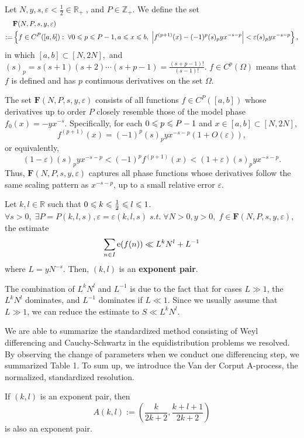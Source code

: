 \begin{definition}
    Let $N, y, s, \varepsilon < \frac{1}{2} \in \mathbb{R}_+ \;$, and $P \in \mathbb{Z}_+$. We define the set 
    \begin{align*}
        &\mathbf{F}(N, P, s, y, \varepsilon) \\
        := &\left\{ f \in C^P([a,b]) : \; \forall 0 \leqslant p \leqslant P-1, a \leqslant x \leqslant b, \; \left\lvert f^{(p+1)}(x) - (-1)^p (s)_p yx^{-s-p} \right\rvert < \varepsilon (s)_p yx^{-s-p} \right\},
    \end{align*}
    in which $[a,b] \subset [N,2N],$ and $(s)_p = s(s+1)(s+2) \cdots (s+p-1) = \frac{(s+p-1)!}{(s-1)!}$. $f \in C^p(\Omega)$ means that $f$ is defined and has $p$ continuous derivatives on the set $\Omega$.
\end{definition}
The set $\mathbf{F}(N, P, s, y, \varepsilon)$ consists of all functions $f \in C^P([a,b])$ whose derivatives up to order $P$ closely resemble those of the model phase $f_0(x) = -y x^{-s}$.
Specifically, for each $0 \leqslant p \leqslant P-1$ and $x \in [a,b] \subset [N,2N]$,
$$f^{(p+1)}(x) = (-1)^p (s)_p yx^{-s-p} (1 + O(\varepsilon)),$$
or equivalently,
$$(1-\varepsilon)(s)_p yx^{-s-p} < (-1)^p f^{(p+1)}(x) < (1+\varepsilon)(s)_p yx^{-s-p}.$$
Thus, $\mathbf{F}(N,P,s,y,\varepsilon)$ captures all phase functions whose derivatives follow the same scaling pattern as $x^{-s-p}$, up to a small relative error $\varepsilon$.

\begin{definition}
    Let $k,l \in \mathbb{R}$ such that $0 \leqslant k \leqslant \frac{1}{2} \leqslant l \leqslant 1$. $\forall s > 0, \; \exists P = P(k, l, s), \varepsilon = \varepsilon(k, l, s) \; s.t. \; \forall N > 0, y > 0, \; f \in \mathbf{F}(N, P, s, y, \varepsilon),$ the estimate $$\sum_{n \in I} \operatorname{e} \! \left( f(n) \right) \ll L^k N^l + L^{-1}$$ where $L = yN^{-s}$. Then, $(k,l)$ is an \textbf{exponent pair}. 
\end{definition}
The combination of $L^k N^l$ and $L^{-1}$ is due to the fact that for cases $L \gg 1$, the $L^k N^l$ dominates, and $L^{-1}$ dominates if $L \ll 1$. Since we usually assume that $L \gg 1$, we can reduce the estimate to $S \ll L^k N^l$.

We are able to summarize the standardized method consisting of Weyl differencing and Cauchy-Schwartz in the equidistribution problems we resolved. By observing the change of parameters when we conduct one differencing step, we summarized Table 1. To sum up, we introduce the Van der Corput A-process, the normalized, standardized resolution.

\begin{theorem} 
    If $(k, l)$ is an exponent pair, then $$A(k, l) := \left( \frac{k}{2k+2}, \frac{k+l+1}{2k+2} \right)$$ is also an exponent pair.
\end{theorem}

